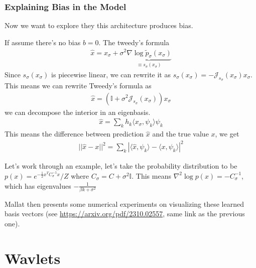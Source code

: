 \subsubsection{Explaining Bias in the Model}
Now we want to explore they this architecture produces bias.

If assume there's no bias $b=0$. The tweedy's formula 
\begin{align}
	\hat x = x_\sigma + \sigma^2 \underbrace{\nabla \log \tilde p_\sigma(x_\sigma)}_{\equiv s_\sigma (x_\sigma)}
\end{align}
Since $s_\sigma (x_\sigma)$ is piecewise linear, we can rewrite it as $s_\sigma (x_\sigma) = - \mathcal J_{s_\sigma}(x_\sigma) x_\sigma$. This means we can rewrite Tweedy's formula as
\begin{align}
	\hat x = \left ( \mathbb I + \sigma^2 \mathcal J_{s_\sigma}(x_\sigma) \right)x_\sigma
\end{align}
we can decompose the interior in an eigenbasis.
\begin{align}
	\hat x = \sum_k h_k \langle x_\sigma, \psi_k\rangle \psi_k
\end{align}
This means the difference between prediction $\hat x$ and the true value $x$, we get
\begin{align}
	||\hat x - x||^2 = \sum_{k} | \langle \hat x , \psi_k \rangle - \langle x, \psi_k \rangle | ^2
\end{align}
\begin{sidework}
	Let's work through an example, let's take the probability distribution to be $p(x) = e^{- \frac{1}{2}x^T C_\sigma^{-1}x} / Z$ where $C_\sigma = C + \sigma^2 \mathbb I$. This means $\nabla^2 \log p(x) = -C_\sigma^{-1}$, which has eigenvalues $-\frac{1}{\beta k + \sigma^2}$
\end{sidework}
Mallat then presents some numerical experiments on visualizing these learned basis vectors (see \url{https://arxiv.org/pdf/2310.02557}, same link as the previous one).

\section{Wavlets}
